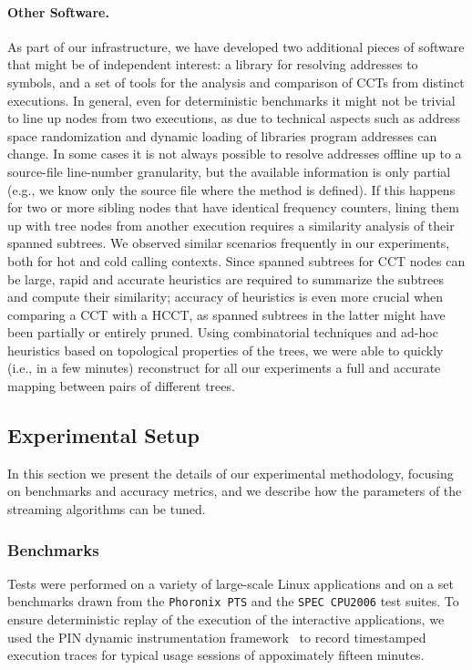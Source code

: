 \paragraph*{Other Software.} As part of our infrastructure, we have developed two additional pieces of software that might be of independent interest: a library for resolving addresses to symbols, and a set of tools for the analysis and comparison of CCTs from distinct executions. In general, even for deterministic benchmarks it might not be trivial to line up nodes from two executions, as due to technical aspects such as address space randomization and dynamic loading of libraries program addresses can change. In some cases it is not always possible to resolve addresses offline up to a source-file line-number granularity, but the available information is only partial (e.g., we know only the source file where the method is defined). If this happens for two or more sibling nodes that have identical frequency counters, lining them up with tree nodes from another execution requires a similarity analysis of their spanned subtrees. We observed similar scenarios frequently in our experiments, both for hot and cold calling contexts. Since spanned subtrees for CCT nodes can be large, rapid and accurate heuristics are required to summarize the subtrees and compute their similarity; accuracy of heuristics is even more crucial when comparing a CCT with a HCCT, as spanned subtrees in the latter might have been partially or entirely pruned. Using combinatorial techniques and ad-hoc heuristics based on topological properties of the trees, we were able to quickly (i.e., in a few minutes) reconstruct for all our experiments a full and accurate mapping between pairs of different trees.

\subsection{Experimental Setup}

In this section we present the details of our experimental methodology, focusing on benchmarks and accuracy metrics, and we describe how the parameters of the streaming algorithms can be tuned.

\subsubsection*{Benchmarks}
Tests were performed on a variety of large-scale Linux applications and on a set benchmarks drawn from the {\tt Phoronix PTS} and the {\tt SPEC CPU2006} test suites. To ensure deterministic replay of the execution of the interactive applications, we used the PIN dynamic instrumentation framework~\cite{Luk05} to record timestamped execution traces for typical usage sessions of appoximately fifteen minutes.

